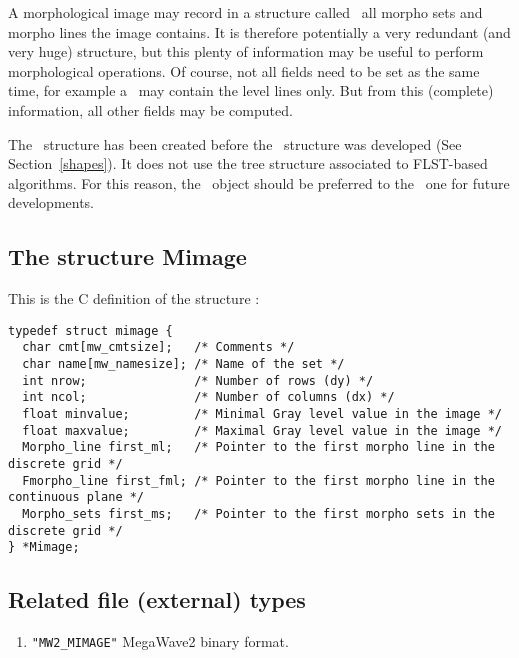 \label{mimage}

A morphological image may record in a structure called \mimage\ all morpho sets
and morpho lines the image contains. It is therefore potentially a very redundant
(and very huge) structure, but this plenty of information may be useful to perform 
morphological operations. Of course, not all fields need to be set as the same time,
for example a \mimage\ may contain the level lines only. But from this (complete) 
information, all other fields may be computed.

The \mimage\ structure has been created before the \shapes\ structure was developed
(See Section~\ref{shapes}).
It does not use the tree structure associated to FLST-based algorithms.
For this reason, the \shapes\ object should be preferred to the \mimage\ one for
future developments.

\subsection{The structure Mimage}
\label{mimage-structure}

This is the C definition of the structure \mimage:
{\small
\begin{verbatim}
typedef struct mimage {
  char cmt[mw_cmtsize];   /* Comments */
  char name[mw_namesize]; /* Name of the set */
  int nrow;               /* Number of rows (dy) */
  int ncol;               /* Number of columns (dx) */
  float minvalue;         /* Minimal Gray level value in the image */
  float maxvalue;         /* Maximal Gray level value in the image */
  Morpho_line first_ml;   /* Pointer to the first morpho line in the discrete grid */
  Fmorpho_line first_fml; /* Pointer to the first morpho line in the continuous plane */
  Morpho_sets first_ms;   /* Pointer to the first morpho sets in the discrete grid */
} *Mimage;
\end{verbatim}
}

\subsection{Related file (external) types}
\label{mimage-file_type}

\begin{enumerate}
\item \verb+"MW2_MIMAGE"+ MegaWave2 binary format.
\end{enumerate}

